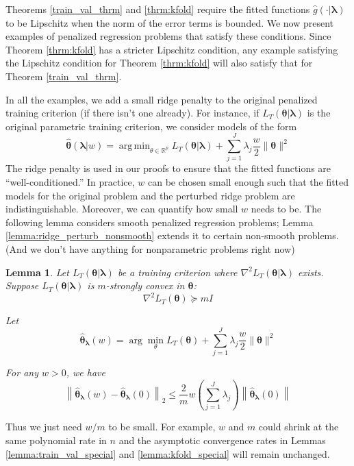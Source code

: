 \documentclass[12pt]{article}
\newtheorem{lemma}{Lemma}
\DeclareMathOperator*{\argmin}{arg\,min}
\begin{document}
Theorems \ref{train_val_thrm} and \ref{thrm:kfold} require the fitted functions $\hat{g}(\cdot | \boldsymbol{\lambda})$ to be Lipschitz when the norm of the error terms is bounded. We now present examples of penalized regression problems that satisfy these conditions. Since Theorem \ref{thrm:kfold} has a stricter Lipschitz condition, any example satisfying the Lipschitz condition for Theorem \ref{thrm:kfold} will also satisfy that for Theorem \ref{train_val_thrm}.

In all the examples, we add a small ridge penalty to the original penalized training criterion (if there isn't one already). For instance, if $L_T(\boldsymbol{\theta} | \boldsymbol{\lambda})$ is the original parametric training criterion, we consider models of the form
\begin{equation}
\hat{\boldsymbol{\theta}}(\boldsymbol{\lambda} | w) = \argmin_{\theta \in \mathbb{R}^p} 
L_T(\boldsymbol{\theta} | \boldsymbol{\lambda})
+ \sum_{j=1}^J \lambda_j \frac{w}{2} \| \boldsymbol{\theta} \|^2
\end{equation}
The ridge penalty is used in our proofs to ensure that the fitted functions are ``well-conditioned.'' In practice, $w$ can be chosen small enough such that the fitted models for the original problem and the perturbed ridge problem are indistinguishable. Moreover, we can quantify how small $w$ needs to be. The following lemma considers smooth penalized regression problems; Lemma \ref{lemma:ridge_perturb_nonsmooth} extends it to certain non-smooth problems. (And we don't have anything for nonparametric problems right now)
\begin{lemma}
	\label{lemma:ridge_perturb_smooth}
Let $L_{T}(\boldsymbol{\theta}|\boldsymbol{\lambda})$ be a training criterion where $\nabla^{2}L_{T}(\boldsymbol{\theta}|\boldsymbol{\lambda})$
exists. Suppose $L_{T}(\boldsymbol{\theta}|\boldsymbol{\lambda})$ is $m$-strongly convex in $\boldsymbol{\theta}$:
$$
\nabla^{2}L_{T}(\boldsymbol{\theta})\succeq mI
$$

Let
\begin{equation}
\hat{\boldsymbol{\theta}}_{\boldsymbol{\lambda}}(w)=\arg\min_{\theta}L_{T}(\boldsymbol{\theta})+\sum_{j=1}^{J}\lambda_{j}\frac{w}{2}\|\boldsymbol{\theta}\|^{2}
\end{equation}

For any $w>0$, we have
\begin{equation}
\left \|
\hat{\boldsymbol{\theta}}_{\boldsymbol{\lambda}}(w)-\hat{\boldsymbol{\theta}}_{\boldsymbol{\lambda}}(0)
\right \|_{2}	
\le	
\frac{2}{m}w\left(\sum_{j=1}^{J}\lambda_{j}\right)
\left \|\hat{\boldsymbol{\theta}}_{\boldsymbol{\lambda}}(0) \right \|
\end{equation} 

\end{lemma}
Thus we just need $w/m$ to be small. For example, $w$ and $m$ could shrink at the same polynomial rate in $n$ and the asymptotic convergence rates in Lemmas \ref{lemma:train_val_special} and \ref{lemma:kfold_special} will remain unchanged.
\end{document}
